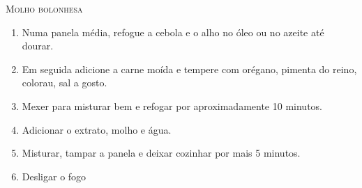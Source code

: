 {  \textsc{Molho bolonhesa}
  \begin{enumerate}
  \item Numa panela média, refogue a cebola e o alho no óleo ou no azeite até
    dourar.
  \item Em seguida adicione a carne moída e tempere com orégano, pimenta do
    reino, colorau, sal a gosto.
  \item Mexer para misturar bem e refogar por aproximadamente 10 minutos.
  \item Adicionar o extrato, molho e água.
  \item Misturar, tampar a panela e deixar cozinhar por mais 5 minutos.
  \item Desligar o fogo
  \end{enumerate}

   }

